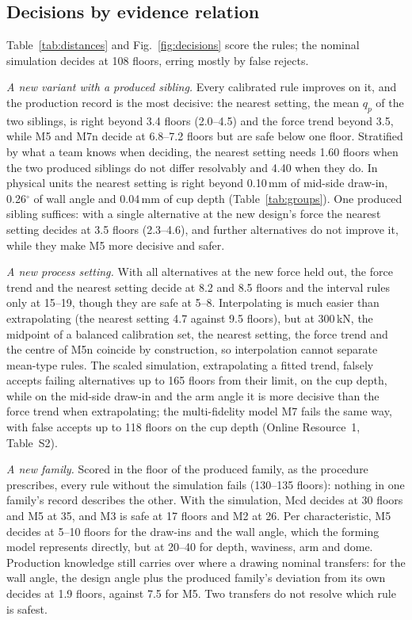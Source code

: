 \documentclass[pdflatex,sn-basic,lineno]{sn-jnl}
\newcommand{\ORt}[1]{Online Resource~1, Table~S#1}
\begin{document}
\subsection{Decisions by evidence relation}\label{sec:res-decisions}

Table~\ref{tab:distances} and Fig.~\ref{fig:decisions} score the rules; the nominal simulation decides at 108 floors, erring mostly by false rejects.

\emph{A new variant with a produced sibling.} Every calibrated rule improves on it, and the production record is the most decisive: the nearest setting, the mean $q_p$ of the two siblings, is right beyond 3.4 floors (2.0--4.5) and the force trend beyond 3.5, while M5 and M7n decide at 6.8--7.2 floors but are safe below one floor. Stratified by what a team knows when deciding, the nearest setting needs 1.60 floors when the two produced siblings do not differ resolvably and 4.40 when they do. In physical units the nearest setting is right beyond 0.10\,mm of mid-side draw-in, 0.26$^\circ$ of wall angle and 0.04\,mm of cup depth (Table~\ref{tab:groups}). One produced sibling suffices: with a single alternative at the new design's force the nearest setting decides at 3.5 floors (2.3--4.6), and further alternatives do not improve it, while they make M5 more decisive and safer.

\emph{A new process setting.} With all alternatives at the new force held out, the force trend and the nearest setting decide at 8.2 and 8.5 floors and the interval rules only at 15--19, though they are safe at 5--8. Interpolating is much easier than extrapolating (the nearest setting 4.7 against 9.5 floors), but at 300\,kN, the midpoint of a balanced calibration set, the nearest setting, the force trend and the centre of M5n coincide by construction, so interpolation cannot separate mean-type rules. The scaled simulation, extrapolating a fitted trend, falsely accepts failing alternatives up to 165 floors from their limit, on the cup depth, while on the mid-side draw-in and the arm angle it is more decisive than the force trend when extrapolating; the multi-fidelity model M7 fails the same way, with false accepts up to 118 floors on the cup depth (\ORt{2}).

\emph{A new family.} Scored in the floor of the produced family, as the procedure prescribes, every rule without the simulation fails (130--135 floors): nothing in one family's record describes the other. With the simulation, Mcd decides at 30 floors and M5 at 35, and M3 is safe at 17 floors and M2 at 26. Per characteristic, M5 decides at 5--10 floors for the draw-ins and the wall angle, which the forming model represents directly, but at 20--40 for depth, waviness, arm and dome. Production knowledge still carries over where a drawing nominal transfers: for the wall angle, the design angle plus the produced family's deviation from its own decides at 1.9 floors, against 7.5 for M5. Two transfers do not resolve which rule is safest.
\end{document}
